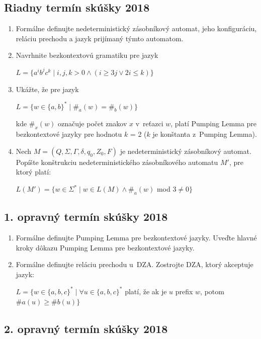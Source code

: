 \documentclass[11pt,a4paper]{article}
\begin{document}
		\subsection{Riadny termín skúšky 2018}

		\begin{enumerate}
			\item Formálne definujte nedeterministický zásobníkový automat, jeho konfiguráciu, reláciu prechodu a jazyk prijímaný týmto automatom.

			\item Navrhnite bezkontextovú gramatiku pre jazyk
	
			$L = \{a^ib^jc^k \mid i,j,k > 0 \land (i \geq 3j \lor 2i \leq k)\}$
	
			\item Ukážte, že pre jazyk
	
			$L = \{w \in \{a,b\}^* \mid \#_a(w) = \#_b(w)\}$
	
			kde $\#_x(w)$ označuje počet znakov $x$ v~reťazci $w$, platí Pumping Lemma pre bezkontextové jazyky pre hodnotu $k$ = 2 ($k$ je konštanta z~Pumping Lemma).
	
			\item Nech $M = (Q, \Sigma, \Gamma, \delta, q_0, Z_0, F)$ je nedeterministický zásobníkový automat. Popíšte konštrukciu nedeterministického zásobníkového automatu $M'$, pre ktorý platí:
	
			$L(M') = \{w \in \Sigma^* \mid w \in L(M) \land \#_a(w)$ mod $3 \neq 0\}$
		
		\end{enumerate}

		\subsection{1. opravný termín skúšky 2018}

		\begin{enumerate}
			\item Formálne definujte Pumping Lemma pre bezkontextové jazyky. Uveďte hlavné kroky dôkazu Pumping Lemma pre bezkontextové jazyky.

			\item Formálne definujte reláciu prechodu u~DZA. Zostrojte DZA, ktorý akceptuje jazyk:
	
			$L = \{w \in \{a,b,c\}^* \mid \forall u \in \{a,b,c\}^*$ platí, že ak je $u$ prefix $w$, potom $\#a(u) \geq \#b(u)\}$
		\end{enumerate}
	
		\subsection{2. opravný termín skúšky 2018}
		
\end{document}
